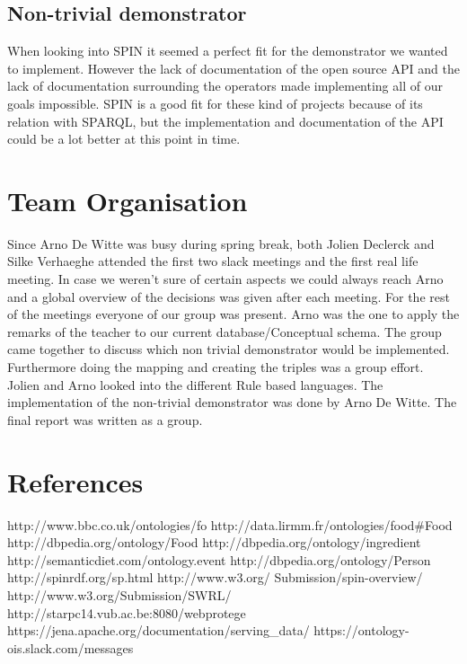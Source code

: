 \subsection*{Non-trivial demonstrator}
When looking into SPIN it seemed a perfect fit for the demonstrator we wanted to implement. However the lack of documentation of the open source API and the lack of documentation surrounding the operators made implementing all of our goals impossible. SPIN is a good fit for these kind of projects because of its relation with SPARQL, but the implementation and documentation of the API could be a lot better at this point in time.

\section{Team Organisation}

Since Arno De Witte was busy during spring break, both Jolien Declerck and Silke Verhaeghe attended the first two slack meetings and the first real life meeting. In case we weren't sure of certain aspects we could always reach Arno and a global overview of the decisions was given after each meeting. For the rest of the meetings everyone of our group was present. Arno was the one to apply the remarks of the teacher to our current database/Conceptual schema. The group came together to discuss which non trivial demonstrator would be implemented. Furthermore doing the mapping and creating the triples was a group effort. Jolien and Arno looked into the different Rule based languages. The implementation of the non-trivial demonstrator was done by Arno De Witte. The final report was written as a group. 

\section*{References}
http://www.bbc.co.uk/ontologies/fo\newline
http://data.lirmm.fr/ontologies/food\#Food\newline
http://dbpedia.org/ontology/Food \newline
http://dbpedia.org/ontology/ingredient\newline
http://semanticdiet.com/ontology.event \newline
http://dbpedia.org/ontology/Person \newline
http://spinrdf.org/sp.html\newline
http://www.w3.org/
Submission/spin-overview/\newline
http://www.w3.org/Submission/SWRL/\newline
http://starpc14.vub.ac.be:8080/webprotege \newline
https://jena.apache.org/documentation/serving\_data/ \newline
https://ontology-ois.slack.com/messages

